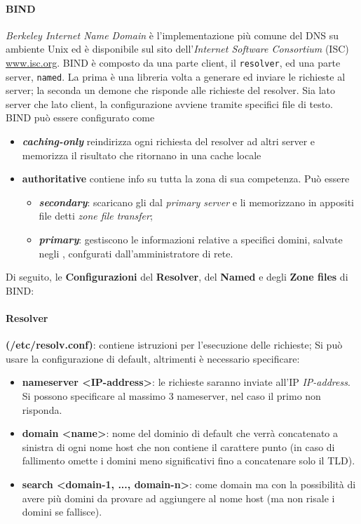 \documentclass[a4paper,11pt]{article}
\def\code#1{\texttt{#1}}
\def\vedi#1{\nameref{#1}}
\def\italic#1{\textit{#1}}
\begin{document}
\paragraph{BIND} \textit{Berkeley Internet Name Domain} è l'implementazione più comune del DNS su ambiente Unix ed è disponibile sul sito dell'\italic{Internet Software Consortium} (ISC) \url{www.isc.org}. BIND è composto da una parte client, il \code{resolver}, ed una parte server, \code{named}. La prima è una libreria volta a generare ed inviare le richieste al server; la seconda un demone che risponde alle richieste del resolver. Sia lato server che lato client, la configurazione avviene tramite specifici file di testo.\\
BIND può essere configurato come 
\begin{itemize}
\item \italic{\textbf{caching-only}} reindirizza ogni richiesta del resolver ad altri server e memorizza il risultato che ritornano in una cache locale
\item \textbf{authoritative} contiene info su tutta la zona di sua competenza. Può essere 
\begin{itemize}
\item \italic{\textbf{secondary}}: scaricano gli \vedi{Zone files} dal \italic{primary server} e li memorizzano in appositi file detti \italic{zone file transfer};
\item \italic{\textbf{primary}}: gestiscono le informazioni relative a specifici domini, salvate negli \vedi{Zone files}, confgurati dall'amministratore di rete.
\end{itemize}
\end{itemize}
Di seguito, le \textbf{Configurazioni} del \textbf{Resolver}, del \textbf{Named} e degli \textbf{Zone files} di BIND:
\paragraph{Resolver} \textbf{(/etc/resolv.conf)}: contiene istruzioni per l'esecuzione delle richieste; Si può usare la configurazione di default, altrimenti è necessario specificare:
\begin{itemize}
\item \textbf{nameserver \textless IP-address\textgreater}: le richieste saranno inviate all'IP \textit{IP-address}. Si possono specificare al massimo 3 nameserver, nel caso il primo non risponda.
\item \textbf{domain \textless name\textgreater}: nome del dominio di default che verrà concatenato a sinistra di ogni nome host che non contiene il carattere punto (in caso di fallimento omette i domini meno significativi fino a concatenare solo il TLD).
\item \textbf{search \textless domain-1, ..., domain-n\textgreater}: come domain ma con la possibilità di avere più domini da provare ad aggiungere al nome host (ma non risale i domini se fallisce).
\end{itemize}
\end{document}
